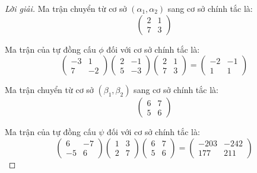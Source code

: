 \documentclass[class=linearalgebra,crop=false]{standalone}
\begin{document}
\begin{proof}[Lời giải]
    Ma trận chuyển từ cơ sở $(\alpha_{1}, \alpha_{2})$ sang cơ sở chính tắc là:
    \[
        \begin{pmatrix}
            2 & 1 \\
            7 & 3
        \end{pmatrix}
    \]
    \par Ma trận của tự đồng cấu $\phi$ đối với cơ sở chính tắc là:
    \[
        \begin{pmatrix}
            -3 & 1  \\
            7  & -2
        \end{pmatrix}
        \begin{pmatrix}
            2 & -1 \\
            5 & -3
        \end{pmatrix}
        \begin{pmatrix}
            2 & 1 \\
            7 & 3
        \end{pmatrix}=
        \begin{pmatrix}
            -2 & -1 \\
            1  & 1
        \end{pmatrix}
    \]
    \par Ma trận chuyển từ cơ sở $(\beta_{1}, \beta_{2})$ sang cơ sở chính tắc là:
    \[
        \begin{pmatrix}
            6 & 7 \\
            5 & 6
        \end{pmatrix}
    \]
    \par Ma trận của tự đồng cấu $\psi$ đối với cơ sở chính tắc là:
    \[
        \begin{pmatrix}
            6  & -7 \\
            -5 & 6
        \end{pmatrix}
        \begin{pmatrix}
            1 & 3 \\
            2 & 7
        \end{pmatrix}
        \begin{pmatrix}
            6 & 7 \\
            5 & 6
        \end{pmatrix}=
        \begin{pmatrix}
            -203 & -242 \\
            177  & 211
        \end{pmatrix}
\]
\end{proof}
\end{document}
